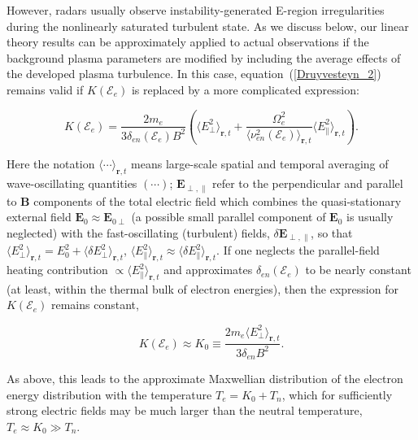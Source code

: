 \documentclass[draft]{agujournal2019}
\renewcommand{\vec}{\mathbf}
\begin{document}
However, radars usually observe instability-generated E-region irregularities
during the nonlinearly saturated turbulent state. As we discuss below, our
linear theory results can be approximately applied to actual observations if
the background plasma parameters are modified by including the average effects
of the developed plasma turbulence. In this case, equation~(\ref{Druyvesteyn_2})
remains valid if $K(\mathcal{E}_{e})$ is replaced by a more complicated
expression:
\begin{linenomath*}
\begin{equation}
K(\mathcal{E}_{e})=\frac{2m_{e}}{3\delta_{en}(\mathcal{E}_{e})B^{2}}\left(
\langle{E}_{\perp}^{2}\rangle_{\vec{r},t}+\frac{\Omega_{e}^{2}}{\langle
\nu_{en}^{2}(\mathcal{E}_{e})\rangle_{\vec{r},t}}\langle{E}_{\parallel
}^{2}\rangle_{\vec{r},t}\right).
\label{K_turbulent}
\end{equation}
\end{linenomath*}
Here the notation
$\langle\cdots\rangle_{\vec{r},t}$ means large-scale spatial and temporal averaging
of wave-oscillating quantities $\left(  \cdots\right)$; $\vec{E}_{\perp,\parallel}$ refer to the perpendicular and parallel to
$\vec{B}$ components of the total electric field which combines the
quasi-stationary external field $\vec{E}_{0}\approx\vec{E}_{0\perp}$ (a possible small 
parallel component of $\vec{E}_0$ is usually neglected) with the
fast-oscillating (turbulent) fields, $\delta\vec{E}_{\perp,\parallel}$, so
that $\langle E_{\perp}^{2}\rangle_{\vec{r},t}=E_{0}^{2}+\langle\delta E_{\perp}^{2}
\rangle_{\vec{r},t}$, $\langle E_{\parallel}^{2}\rangle_{\vec{r},t}
\approx\langle\delta E_{\parallel}^{2}\rangle_{\vec{r},t}$. If one neglects the
parallel-field heating contribution $\propto\langle{E}_{\parallel}^{2}\rangle_{\vec{r},t}$ 
and approximates $\delta_{en}(\mathcal{E}_{e})$ to be
nearly constant (at least, within the thermal bulk of electron energies), then
the expression for $K(\mathcal{E}_{e})$ remains constant,
\begin{linenomath*}
\[
K(\mathcal{E}_{e})\approx K_{0}\equiv\frac{2m_{e}\langle{E}_{\perp}%
^{2}\rangle_{\vec{r},t}}{3\delta_{en}B^{2}}.
\]
\end{linenomath*}
As above, this leads to the approximate Maxwellian distribution of the
electron energy distribution with the temperature $T_{e}=K_{0}+T_{n}$, which
for sufficiently strong electric fields may be much larger than the neutral
temperature, $T_{e}\approx K_{0}\gg T_{n}$.
\end{document}
